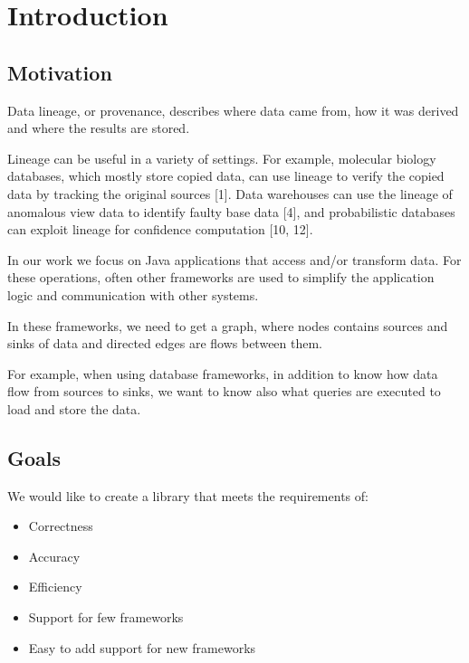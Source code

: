 
\chapter{Introduction}



\section{Motivation}

Data lineage, or provenance, describes where data came from,
how it was derived and where the results are stored.

Lineage can be useful in a variety of settings. For example,
molecular biology databases, which mostly store copied data,
can use lineage to verify the copied data by tracking
the original sources [1]. Data warehouses can use the lineage
of anomalous view data to identify faulty base data [4],
and probabilistic databases can exploit lineage for
confidence computation [10, 12].

In our work we focus on Java applications that access and/or transform data.
For these operations, often other frameworks are used to simplify
the application logic and communication with other systems.

In these frameworks, we need to get a graph, where nodes
contains sources and sinks of data and directed edges
are flows between them.

For example, when using database frameworks, in addition to
know how data flow from sources to sinks, we want to know
also what queries are executed to load and store the data.





\section{Goals}

We would like to create a library that meets the requirements of:

\begin{itemize}
  \item Correctness
  \item Accuracy
  \item Efficiency
  \item Support for few frameworks
  \item Easy to add support for new frameworks
\end{itemize}

